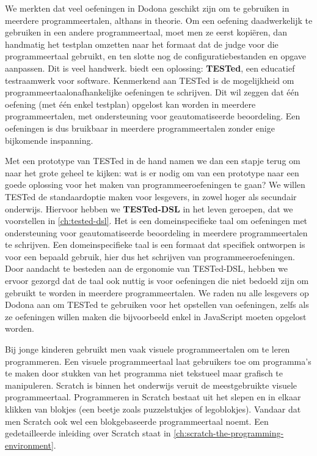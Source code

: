 \documentclass[main]{subfiles}
\begin{document}
We merkten dat veel oefeningen in Dodona geschikt zijn om te gebruiken in meerdere programmeertalen, althans in theorie.
Om een oefening daadwerkelijk te gebruiken in een andere programmeertaal, moet men ze eerst kopiëren, dan handmatig het testplan omzetten naar het formaat dat de judge voor die programmeertaal gebruikt, en ten slotte nog de configuratiebestanden en opgave aanpassen.
Dit is veel handwerk.
 biedt een oplossing: \textbf{TESTed}, een educatief testraamwerk voor software.
Kenmerkend aan TESTed is de mogelijkheid om programmeertaalonafhankelijke oefeningen te schrijven.
Dit wil zeggen dat één oefening (met één enkel testplan) opgelost kan worden in meerdere programmeertalen, met ondersteuning voor geautomatiseerde beoordeling.
Een oefeningen is dus bruikbaar in meerdere programmeertalen zonder enige bijkomende inspanning.

Met een prototype van TESTed in de hand namen we dan een stapje terug om naar het grote geheel te kijken: wat is er nodig om van een prototype naar een goede oplossing voor het maken van programmeeroefeningen te gaan?
We willen TESTed de standaardoptie maken voor lesgevers, in zowel hoger als secundair onderwijs.
Hiervoor hebben we \textbf{TESTed-DSL} in het leven geroepen, dat we voorstellen in \cref{ch:tested-dsl}.
Het is een domeinspecifieke taal om oefeningen met ondersteuning voor geautomatiseerde beoordeling in meerdere programmeertalen te schrijven.
Een domeinspecifieke taal is een formaat dat specifiek ontworpen is voor een bepaald gebruik, hier dus het schrijven van programmeeroefeningen.
Door aandacht te besteden aan de ergonomie van TESTed-DSL, hebben we ervoor gezorgd dat de taal ook nuttig is voor oefeningen die niet bedoeld zijn om gebruikt te worden in meerdere programmeertalen.
We raden nu alle lesgevers op Dodona aan om TESTed te gebruiken voor het opstellen van oefeningen, zelfs als ze oefeningen willen maken die bijvoorbeeld enkel in JavaScript moeten opgelost worden.

Bij jonge kinderen gebruikt men vaak visuele programmeertalen om te leren programmeren.
Een visuele programmeertaal laat gebruikers toe om programma's te maken door stukken van het programma niet tekstueel maar grafisch te manipuleren.
Scratch is binnen het onderwijs veruit de meestgebruikte visuele programmeertaal.
Programmeren in Scratch bestaat uit het slepen en in elkaar klikken van blokjes (een beetje zoals puzzelstukjes of legoblokjes).
Vandaar dat men Scratch ook wel een blokgebaseerde programmeertaal noemt.
Een gedetailleerde inleiding over Scratch staat in \cref{ch:scratch-the-programming-environment}.
\end{document}
